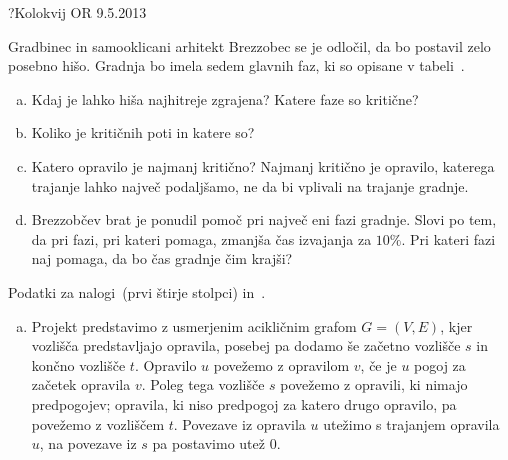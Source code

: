 \begin{naloga}{?}{Kolokvij OR 9.5.2013}
\begin{vprasanje}
Gradbinec in samooklicani arhitekt Brezzobec se je odločil,
da bo postavil zelo posebno hišo.
Gradnja bo imela sedem glavnih faz,
ki so opisane v tabeli~\tab.
\begin{enumerate}[(a)]
\item Kdaj je lahko hiša najhitreje zgrajena?
Katere faze so kritične?
\item Koliko je kritičnih poti in katere so?
\item Katero opravilo je najmanj kritično?
Najmanj kritično je opravilo, katerega trajanje lahko največ podaljšamo,
ne da bi vplivali na trajanje gradnje.
\item Brezzobčev brat je ponudil pomoč pri največ eni fazi gradnje.
Slovi po tem, da pri fazi, pri kateri pomaga, zmanjša čas izvajanja za $10\%$.
Pri kateri fazi naj pomaga, da bo čas gradnje čim krajši?
\end{enumerate}

\begin{tabela}
\caption{Podatki za nalogi~\nal (prvi štirje stolpci)
in~.}
\end{tabela}
\end{vprasanje}

\begin{odgovor}
\begin{enumerate}[(a)]
\item Projekt predstavimo z usmerjenim acikličnim grafom $G = (V, E)$,
kjer vozlišča predstavljajo opravila,
posebej pa dodamo še začetno vozlišče $s$ in končno vozlišče $t$.
Opravilo $u$ povežemo z opravilom $v$,
če je $u$ pogoj za začetek opravila $v$.
Poleg tega vozlišče $s$ povežemo z opravili, ki nimajo predpogojev;
opravila, ki niso predpogoj za katero drugo opravilo,
pa povežemo z vozliščem $t$.
Povezave iz opravila $u$ utežimo s trajanjem opravila $u$,
na povezave iz $s$ pa postavimo utež $0$.


\end{enumerate}
\end{odgovor}
\end{naloga}
